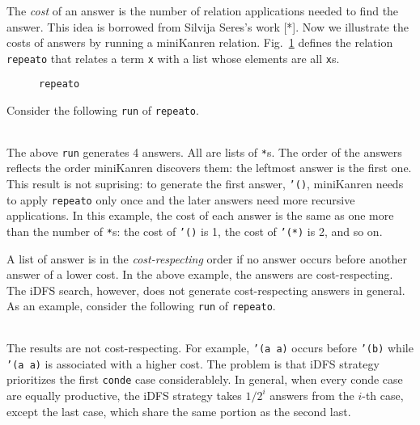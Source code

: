 \documentclass[format=acmlarge, review=true, authordraft=true]{acmart}
\begin{document}
The \emph{cost} of an answer is the number of relation applications needed to
find the answer. This idea is borrowed from Silvija Seres's work [*].
Now we illustrate the costs of answers by running a miniKanren relation.
Fig.~\ref{def-repeato} defines the relation \texttt{repeato} that 
relates a term \texttt{x} with a list whose elements are all \texttt{x}s.

\begin{figure}
  
  \caption{\texttt{repeato}}
  \label{def-repeato}
\end{figure}

Consider the following \texttt{run} of \texttt{repeato}.
\begin{center}
  \begin{tabular}{c}
  
   \end{tabular}
\end{center}

The above \texttt{run} generates 4 answers. All are lists of \texttt{*}s.
The order of the answers reflects the order miniKanren discovers them:
the leftmost answer is the first one. This result is not suprising:
to generate the first answer, \texttt{'()}, miniKanren needs to apply
\texttt{repeato} only once and the later answers need more recursive
applications. In this example, the cost of each answer is the same as
one more than the number of \texttt{*}s: the cost of \texttt{'()} is 1,
the cost of \texttt{'(*)} is 2, and so on.

A list of answer is in the \emph{cost-respecting} order if no answer occurs
before another answer of a lower cost. In the above example, the answers are
cost-respecting. The iDFS search, however, does not generate cost-respecting
answers in general. As an example, consider the following \texttt{run} of
\texttt{repeato}.
\begin{center}
  \begin{tabular}{c}
   
   \end{tabular}
\end{center}

The results are not cost-respecting. For example, \texttt{'(a a)} occurs before
\texttt{'(b)} while \texttt{'(a a)} is associated with a higher cost. 
The problem is that iDFS strategy prioritizes the first \texttt{conde} case
considerablely. In general, when every conde case are equally productive, the iDFS
strategy takes $1/2^{i}$ answers from the $i$-th case, except the last case,
which share the same portion as the second last.
\end{document}
